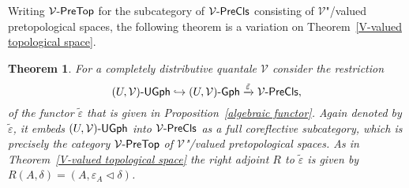 \documentclass[preprint, a4paper]{elsarticle}
\newtheorem{theorem}{Theorem}[section]
\theoremstyle{definition}
\theoremstyle{remark}
\providecommand{\propref}[1]{Proposition~\ref{#1}}
\providecommand{\thmref}[1]{Theorem~\ref{#1}}
\providecommand{\xrar}[1]{\xrightarrow{#1}}
\providecommand{\into}{\hookrightarrow}
\providecommand{\eps}{\varepsilon}
\providecommand{\catvar}[1]{\mathcal{#1}}
\providecommand{\2}{\mathsf 2}
\providecommand{\V}{\catvar V}
\providecommand{\PreTop}[1]{#1\text-\mathsf{PreTop}}
\providecommand{\PreCls}[1]{#1\text-\mathsf{PreCls}}
\providecommand{\Gph}[1]{#1\text-\mathsf{Gph}}
\providecommand{\UGph}[1]{#1\text-\mathsf{UGph}}
\providecommand{\lhom}{\triangleleft}
\begin{document}
	Writing $\PreTop\V$ for the subcategory of $\PreCls\V$ consisting of $\V$"/valued pretopological spaces, the following theorem is a variation on \thmref{V-valued topological space}.
	\begin{theorem} \label{V-valued pretopological space}
		For a completely distributive quantale $\V$ consider the restriction
		\begin{displaymath}
			\UGph{(U, \V)} \into \Gph{(U, \V)} \xrar{\tilde \eps}\PreCls\V,
		\end{displaymath}
		of the functor $\tilde \eps$ that is given in \propref{algebraic functor}. Again denoted by $\tilde \eps$, it embeds $\UGph{(U, \V)}$ into $\PreCls\V$ as a full coreflective subcategory, which is precisely the category $\PreTop\V$ of $\V$"/valued pretopological spaces. As in \thmref{V-valued topological space} the right adjoint $R$ to $\tilde\eps$ is given by $R(A, \delta) = (A, \eps_A \lhom \delta)$.
	\end{theorem}
\end{document}
